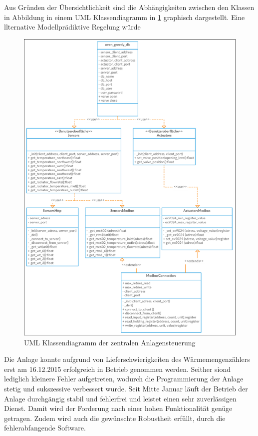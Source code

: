 

Aus Gründen der Übersichtlichkeit sind die Abhängigkeiten zwischen den Klassen in Abbildung in einem UML Klassendiagramm in \ref{fig:uml} graphisch dargestellt. Eine llternative Modellprädiktive Regelung würde 

\begin{figure}
\centering
\includegraphics[width=\textwidth]{abbildungen/20160327_uml}
\caption{UML Klassendiagramm der zentralen Anlagensteuerung}
\label{fig:uml}
\end{figure}

Die Anlage konnte aufgrund von Lieferschwierigkeiten des Wärmemengenzählers erst am 16.12.2015 erfolgreich in Betrieb genommen werden. Seither siond lediglich kleinere Fehler aufgetreten, wodurch die Programmierung der Anlage stetig und sukszessive verbessert wurde.
Seit Mitte Januar läuft der Betrieb der Anlage durchgängig stabil und fehlerfrei und leistet einen sehr zuverlässigen Dienst.
Damit wird der Forderung nach einer hohen Funktionalität genüge getragen. Zudem wird auch die gewünschte Robustheit erfüllt, durch die fehlerabfangende Software.

